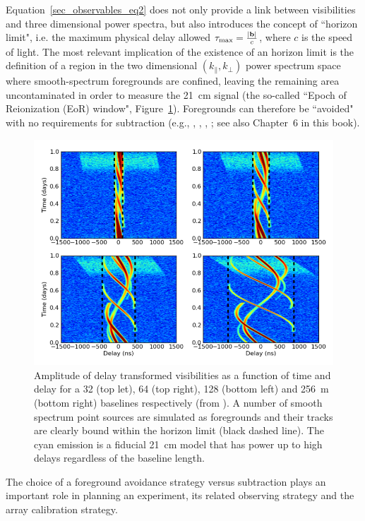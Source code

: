 Equation~\ref{sec_observables_eq2} does not only provide a link between visibilities and three dimensional power spectra, but also introduces the concept of ``horizon limit", i.e. the maximum physical delay allowed $\tau_{\rm max} = \frac{|{\bf b}|}{c}$, where $c$ is the speed of light. The most relevant implication of the existence of an horizon limit is the definition of a region in the two dimensional $(k_\parallel,k_\perp)$ power spectrum space where smooth-spectrum foregrounds are confined, leaving the remaining area  uncontaminated in order to measure the 21~cm signal (the so-called ``Epoch of Reionization (EoR) window", Figure~\ref{fig:fig2}). Foregrounds can therefore be ``avoided" with no requirements for subtraction (e.g., \cite{morales12}, \cite{vedantham12}, \cite{pober13}, \cite{thyagarajan13}; see also Chapter~6 in this book).
\begin{figure}[]
\begin{center}
\includegraphics[width=1.\textwidth]{Bernardi/delay_transform}
\end{center}
\caption{Amplitude of delay transformed visibilities as a function of time and delay for a 32 (top let), 64 (top right), 128 (bottom left) and 256~m (bottom right) baselines respectively (from \cite{parsons12a}). A number of smooth spectrum point sources are simulated as foregrounds and their tracks are clearly bound within the horizon limit (black dashed line). The cyan emission is a fiducial 21~cm model that has power up to high delays regardless of the baseline length.}
\label{fig:fig2}
\end{figure}
The choice of a foreground avoidance strategy versus subtraction plays an important role in planning an experiment, its related observing strategy and the array calibration strategy.


